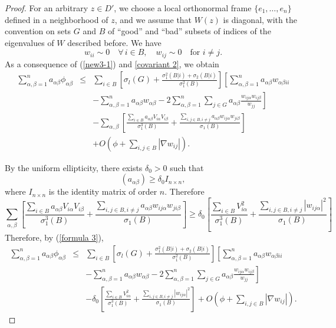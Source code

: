\documentclass[12pt]{amsart}
\newcommand{\1}{\mathbf 1}
\begin{document}
\begin{proof} For an arbitrary $z\in D'$, we choose a local orthonormal frame $\{e_1,\dots,e_n\}$ defined in a neighborhood of $z$, and we assume that $W(z)$ is diagonal, with the convention on sets $G$ and $B$ of ``good'' and ``bad'' subsets of indices of the eigenvalues of $W$ described before. We have 
$$
w_{ii}\sim0\quad\forall\, i\in B,\quad w_{ij}\sim0\quad\mbox{for $i\ne j$.}
$$
As a consequence of (\ref{new3-1})  and \eqref{covariant 2}, we obtain
\begin{eqnarray}\label{formula 3}
\sum_{\alpha,\beta=1}^na_{\alpha\beta}\phi_{\alpha\beta}&\leq &\sum_{i\in B}\left[\sigma_l(G)+\frac{\sigma_{1}^{2}(B|i)+
\sigma_{2}(B|i)}{\sigma_{1}^{2}(B)}\right]\left[\sum_{\alpha,\beta=1}^na_{\alpha\beta}w_{\alpha\beta ii}\right.\\ \nonumber
&&\left.-\sum_{\alpha,\beta=1}^na_{\alpha\beta}w_{\alpha\beta}-2\sum_{\alpha,\beta=1}^n\sum_{j\in G}a_{\alpha\beta}\frac{w_{ij\alpha}w_{ij\beta}}{w_{jj}}\right]\\ \nonumber && -\sum_{\alpha,\beta}\left[\frac{\sum_{i\in
B}a_{\alpha \beta}V_{i\alpha}V_{i\beta}}{\sigma^3_{1}(B)} +\frac{\sum_{i,j\in B,
i\neq j}a_{\alpha\beta}w_{ij\alpha}w_{ji\beta}}{\sigma_{1}(B)}\right]\\ \nonumber
&&+O\left(\phi +\sum_{i,j\in B}|\nabla w_{ij}|\right).
\end{eqnarray}

By the uniform ellipticity, there exists $\delta_0>0$ such that
\[
(a_{\alpha\beta}) \ge \delta_0 I_{n\times n},
\]
where $I_{n\times n}$ is the identity matrix of order $n$. Therefore
\[
\sum_{\alpha,\beta}\left[\frac{\sum_{i\in
B}a_{\alpha \beta}V_{i\alpha}V_{i\beta}}{\sigma^3_{1}(B)} +\frac{\sum_{i,j\in B,
i\neq j}a_{\alpha\beta}
w_{ij\alpha}w_{ji\beta}}{\sigma_{1}(B)}\right]\ge \delta_0 \left[\frac{\sum_{i\in
B}V^2_{i\alpha}}{\sigma^3_{1}(B)} +\frac{\sum_{i,j\in B,
i\neq j}
|w_{ij\alpha}|^2}{\sigma_{1}(B)}\right]
\]
Therefore, by (\ref{formula 3}),
\begin{eqnarray}\label{formula 4}
\sum_{\alpha,\beta=1}^na_{\alpha\beta}\phi_{\alpha\beta}&\leq &\sum_{i\in B}\left[\sigma_l(G)+\frac{\sigma_{1}^{2}(B|i)+
\sigma_{2}(B|i)}{\sigma_{1}^{2}(B)}\right]\left[\sum_{\alpha,\beta=1}^na_{\alpha\beta}w_{\alpha\beta ii}\right.\\ \nonumber
&&\left.-\sum_{\alpha,\beta=1}^na_{\alpha\beta}w_{\alpha\beta}-2\sum_{\alpha,\beta=1}^n\sum_{j\in G}a_{\alpha\beta}\frac{w_{ij\alpha}w_{ij\beta}}{w_{jj}}\right]\\ \nonumber && -\delta_0 \left[\frac{\sum_{i\in
B}V^2_{i\alpha}}{\sigma^3_{1}(B)} +\frac{\sum_{i,j\in B,
i\neq j}
|w_{ij\alpha}|^2}{\sigma_{1}(B)}\right]+O\left(\phi +\sum_{i,j\in B}|\nabla w_{ij}|\right).
\end{eqnarray}


\end{proof}
\end{document}
